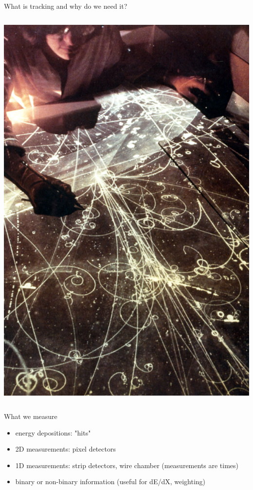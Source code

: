 \documentclass[presentation]{etp-beamer-fancy}
\begin{document}
\begin{frame}[label={sec:org387b453}]{What is tracking and why do we need it?}
\begin{column}{0.4\columnwidth}
\begin{center}
\includegraphics[width=.9\linewidth]{./figures/fermilab_bubble_chamber_scanner.jpg}
\end{center}
\end{column}
\end{frame}
\begin{frame}[label={sec:org4f28c85}]{What we measure}
\begin{itemize}
\item energy depositions: "hits"
\item 2D measurements: pixel detectors
\item 1D measurements: strip detectors, wire chamber (measurements are times)
\item binary or non-binary information (useful for dE/dX, weighting)
\end{itemize}
\end{frame}
\end{document}
